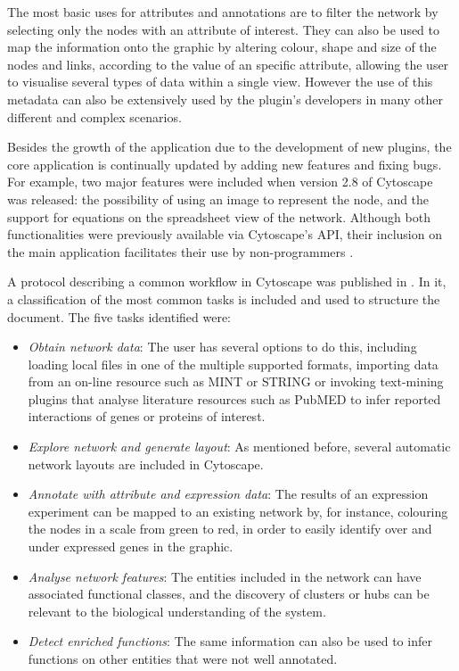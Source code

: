 The most basic uses for attributes and annotations are to filter the network by selecting only the nodes with an attribute of interest. They can also be used to map the information onto the graphic by altering colour, shape and size of the nodes and links, according to the value of an specific attribute, allowing the user to visualise several types of data within a single view. However the use of this metadata can also be extensively used by the plugin's developers in many other different and complex scenarios.

Besides the growth of the application due to the development of new plugins, the core application is continually updated by adding new features and fixing bugs. For example, two major features were included when version 2.8 of Cytoscape was released: the possibility of using an image to represent the node, and the support for equations on the spreadsheet view of the network. Although both functionalities were previously available via Cytoscape's API, their inclusion on the main application facilitates their use by non-programmers \cite{SMO2011}.

A protocol describing a common workflow in Cytoscape was published in \cite{CLI2007}. In it, a classification of the most common tasks is included and used to structure the document. The five tasks identified were: 
\begin{itemize}
\setlength\itemsep{-0.3em}
        \item \emph{Obtain network data}: The user has several options to do this, including loading local files in one of the multiple supported formats, importing data from an on-line resource such as MINT or STRING or invoking text-mining plugins that analyse literature resources such as PubMED to infer reported interactions of genes or proteins of interest.
        \item \emph{Explore network and generate layout}: As mentioned before, several automatic network layouts are included in Cytoscape.
        \item \emph{Annotate with attribute and expression data}: The results of an expression experiment can be mapped to an existing network by, for instance, colouring the nodes in a scale from green to red, in order to easily identify over and under expressed genes in the graphic.
        \item \emph{Analyse network features}: The entities included in the network can have associated functional classes, and the discovery of clusters or hubs can be relevant to the biological understanding of the system.
        \item \emph{Detect enriched functions}: The same information can also be used to infer functions on other entities that were not well annotated.
\end{itemize}


